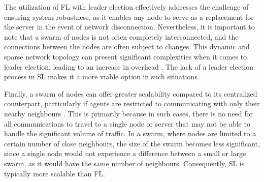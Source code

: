 The utilization of FL with leader election effectively addresses the challenge of ensuring system robustness, as it enables any node to serve as a replacement for the server in the event of network disconnection. Nevertheless, it is important to note that a swarm of nodes is not often completely interconnected, and the connections between the nodes are often subject to changes. This dynamic and sparse network topology can present significant complexities when it comes to leader election, leading to an increase in overhead \cite{leaderelection}. The lack of a leader election process in SL makes it a more viable option in such situations.

Finally, a swarm of nodes can offer greater scalability compared to its centralized counterpart, particularly if agents are restricted to communicating with only their nearby neighbours \cite{swarmscalable}. This is primarily because in such cases, there is no need for all communications to travel to a single node or server that may not be able to handle the significant volume of traffic. In a swarm, where nodes are limited to a certain number of close neighbours, the size of the swarm becomes less significant, since a single node would not experience a difference between a small or large swarm, as it would have the same number of neighbours. Consequently, SL is typically more scalable than FL.